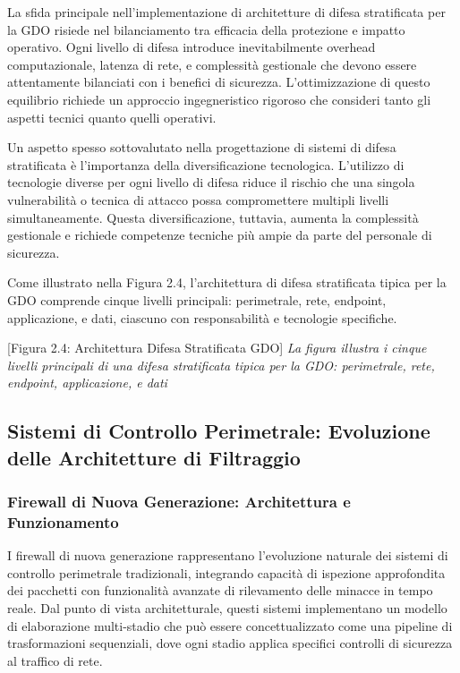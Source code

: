 {La sfida principale nell'implementazione di architetture di difesa stratificata per la GDO risiede nel bilanciamento tra efficacia della protezione e impatto operativo. Ogni livello di difesa introduce inevitabilmente overhead computazionale, latenza di rete, e complessità gestionale che devono essere attentamente bilanciati con i benefici di sicurezza. L'ottimizzazione di questo equilibrio richiede un approccio ingegneristico rigoroso che consideri tanto gli aspetti tecnici quanto quelli operativi.

Un aspetto spesso sottovalutato nella progettazione di sistemi di difesa stratificata è l'importanza della diversificazione tecnologica. L'utilizzo di tecnologie diverse per ogni livello di difesa riduce il rischio che una singola vulnerabilità o tecnica di attacco possa compromettere multipli livelli simultaneamente. Questa diversificazione, tuttavia, aumenta la complessità gestionale e richiede competenze tecniche più ampie da parte del personale di sicurezza.

Come illustrato nella Figura 2.4, l'architettura di difesa stratificata tipica per la GDO comprende cinque livelli principali: perimetrale, rete, endpoint, applicazione, e dati, ciascuno con responsabilità e tecnologie specifiche.

[Figura 2.4: Architettura Difesa Stratificata GDO]
\textit{La figura illustra i cinque livelli principali di una difesa stratificata tipica per la GDO: perimetrale, rete, endpoint, applicazione, e dati}

\subsection{Sistemi di Controllo Perimetrale: Evoluzione delle Architetture di Filtraggio}

\subsubsection{Firewall di Nuova Generazione: Architettura e Funzionamento}

I firewall di nuova generazione rappresentano l'evoluzione naturale dei sistemi di controllo perimetrale tradizionali, integrando capacità di ispezione approfondita dei pacchetti con funzionalità avanzate di rilevamento delle minacce in tempo reale. Dal punto di vista architetturale, questi sistemi implementano un modello di elaborazione multi-stadio che può essere concettualizzato come una pipeline di trasformazioni sequenziali, dove ogni stadio applica specifici controlli di sicurezza al traffico di rete.

}
